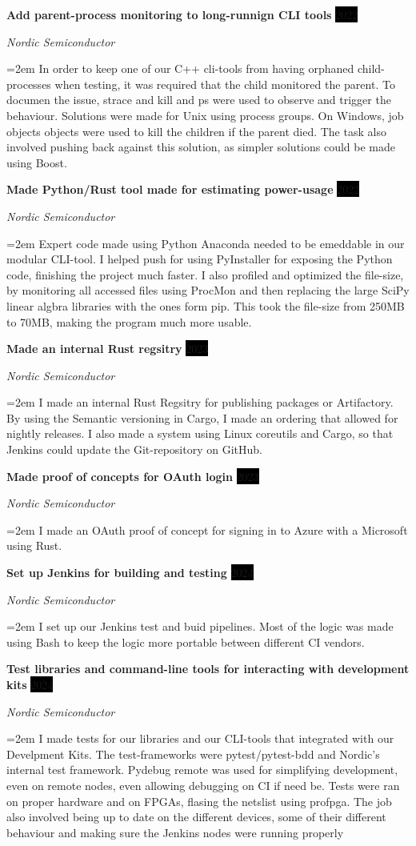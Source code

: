 \documentclass[paper=a4,fontsize=11pt,norsk]{scrartcl} %
\newcommand{\EducationEntry}[4]{
		\noindent \textbf{#1} \hfill      %
		\colorbox{Black}{%
			\parbox{6em}{%
			\hfill\color{White}#2}} \par  %
		\noindent \textit{#3} \par        %
		\noindent\hangindent=2em\hangafter=0 \small #4 %
		\normalsize \par}
\newcommand{\WorkEntry}[4]{				  %
		\noindent \textbf{#1} \hfill      %
		\colorbox{Black}{\color{White}#2} \par  %
		\noindent \textit{#3} \par              %
		\noindent\hangindent=2em\hangafter=0 \small #4 %
		\normalsize \par}
\begin{document}
\WorkEntry{Add parent-process monitoring to long-runnign CLI tools}{2022}{Nordic Semiconductor}
{
In order to keep one of our C++ cli-tools from having orphaned child-processes when
testing, it was required that the child monitored the parent. To documen the issue,
strace and kill and ps were used to observe and trigger the behaviour. Solutions were
made for Unix using process groups. On Windows, job objects objects were used
to kill the children if the parent died. The task also involved pushing back
against this solution, as simpler solutions could be made using Boost.
}



\WorkEntry{Made Python/Rust tool made for estimating power-usage}{2022}{Nordic Semiconductor}
{
Expert code made using Python Anaconda needed to be emeddable in our modular
CLI-tool. I helped push for using PyInstaller for exposing the Python code,
finishing the project much faster. I also profiled and optimized the file-size,
by monitoring all accessed files using ProcMon and then replacing the large
SciPy linear algbra libraries with the ones form pip. This took the file-size
from 250MB to 70MB, making the program much more usable.
}


\WorkEntry{Made an internal Rust regsitry}{2023}{Nordic Semiconductor}
{
I made an internal Rust Regsitry for publishing packages or Artifactory. By
using the Semantic versioning in Cargo, I made an ordering that allowed for
nightly releases. I also made a system using Linux coreutils and Cargo, so that
Jenkins could update the Git-repository on GitHub.
}


\WorkEntry{Made proof of concepts for OAuth login}{2023}{Nordic Semiconductor}
{
I made an OAuth proof of concept for signing in to Azure with a Microsoft using
Rust.
}


\WorkEntry{Set up Jenkins for building and testing}{2024}{Nordic Semiconductor}
{
    I set up our Jenkins test and buid pipelines. Most of the logic was made using Bash to keep the logic more portable between different CI vendors.
}


\WorkEntry{Test libraries and command-line tools for interacting with development kits}{2024}{Nordic Semiconductor}
{
I made tests for our libraries and our CLI-tools that integrated with our
Develpment Kits. The test-frameworks were pytest/pytest-bdd and Nordic's
internal test framework. Pydebug remote was used for simplifying development,
even on remote nodes, even allowing debugging on CI if need be. Tests were ran
on proper hardware and on FPGAs, flasing the netslist using profpga. The job
also involved being up to date on the different devices, some of their
different behaviour and making sure the Jenkins nodes were running properly
}
\end{document}
